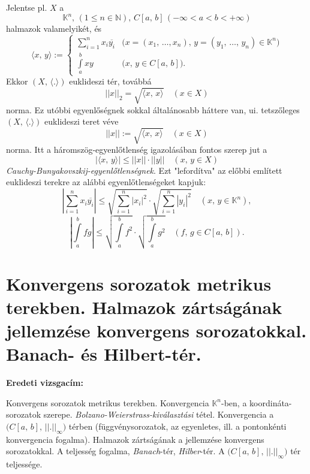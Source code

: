 \documentclass[12pt]{article}
\newcommand{\N}{\mathbb{N}}
\newcommand{\K}{\mathbb{K}}
\begin{document}
    Jelentse pl. $X$ a
    \[
        \K^n, \, (1 \leq n \in \N), \, C[a, \, b] \, (- \infty < a < b < + \infty)
    \]
    halmazok valamelyikét, és
    \[
        \langle x, \, y \rangle :=
        \begin{cases}
            \displaystyle \sum_{i = 1}^n x_i \overline{y_i} & \big( x = (x_1, \, \dots, x_n), \, y = (y_1, \, \dots, \, y_n) \in \K^n \big) \\
            \displaystyle \int\limits_a^b xy & \big( x, \, y \in C[a, \, b] \big).
        \end{cases}
    \]
    Ekkor $(X, \, \langle . \rangle)$ euklideszi tér, továbbá
    \[
        ||x||_2 = \sqrt{\langle x, \, x \rangle} \quad (x \in X)
    \]
    norma. Ez utóbbi egyenlőségnek sokkal általánosabb háttere van, ui. tetszőleges $(X, \, \langle . \rangle)$ euklideszi teret véve
    \[
        ||x|| := \sqrt{ \langle x, \, x \rangle } \quad (x \in X)
    \]
    norma. Itt a háromszög-egyenlőtlenség igazolásában fontos szerep jut a
    \[
        \big| \langle x, \, y \rangle \big| \leq ||x|| \cdot ||y|| \quad (x, \, y \in X)
    \]
    \textit{Cauchy-Bunyakovszkij-egyenlőtlenségnek}. Ezt "lefordítva" az előbbi említett euklideszi terekre az alábbi egyenlőtlenségeket kapjuk:
    \[
        \left| \sum_{i=1}^n x_i\overline{y_i}  \right| \leq \sqrt{\sum_{i=1}^n |x_i|^2} \cdot \sqrt{\sum_{i=1}^n |y_i|^2} \quad (x, \, y \in \K^n),
    \]
    \[
        \left| \int\limits_a^b fg \right| \leq \sqrt{\int\limits_a^b f^2} \cdot \sqrt{\int\limits_a^b g^2} \quad (f, \, g \in C[a, \, b]).
    \]

    \newpage
    \section{Konvergens sorozatok metrikus terekben. Halmazok zártságának jellemzése konvergens sorozatokkal. Banach- és Hilbert-tér.}
    \textbf{Eredeti vizsgacím:}
    
    Konvergens sorozatok metrikus terekben. Konvergencia $\K^n$-ben, a koordináta-sorozatok szerepe. \textit{Bolzano-Weierstrass-kiválasztási} tétel. Konvergencia a $\big( C[a, \, b], \, ||.||_\infty \big)$ térben (függvénysorozatok, az egyenletes, ill. a pontonkénti konvergencia fogalma). Halmazok zártságának a jellemzése konvergens sorozatokkal. A teljesség fogalma, \textit{Banach}-tér, \textit{Hilber}-tér. A $\big( C[a, \, b], \, ||.||_\infty \big)$ tér teljessége.
\end{document}
